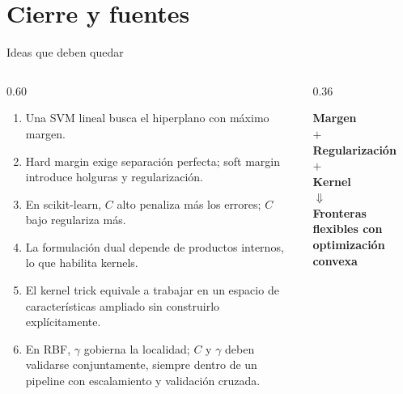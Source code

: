 \section{Cierre y fuentes}

\begin{frame}{Ideas que deben quedar}
\footnotesize
\begin{columns}[T,onlytextwidth]
\begin{column}{0.60\textwidth}
\begin{enumerate}
  \item Una SVM lineal busca el hiperplano con máximo margen.
  \item Hard margin exige separación perfecta; soft margin introduce holguras y regularización.
  \item En scikit-learn, $C$ alto penaliza más los errores; $C$ bajo regulariza más.
  \item La formulación dual depende de productos internos, lo que habilita kernels.
  \item El kernel trick equivale a trabajar en un espacio de características ampliado sin construirlo explícitamente.
  \item En RBF, $\gamma$ gobierna la localidad; $C$ y $\gamma$ deben validarse conjuntamente, siempre dentro de un pipeline con escalamiento y validación cruzada.
\end{enumerate}
\end{column}
\begin{column}{0.36\textwidth}
\begin{keybox}
\centering
\large
\textbf{Margen}\\[0.14cm]
$+$\\[0.14cm]
\textbf{Regularización}\\[0.14cm]
$+$\\[0.14cm]
\textbf{Kernel}\\[0.18cm]
$\Downarrow$\\[0.18cm]
\textbf{Fronteras flexibles con optimización convexa}
\end{keybox}
\end{column}
\end{columns}
\end{frame}

